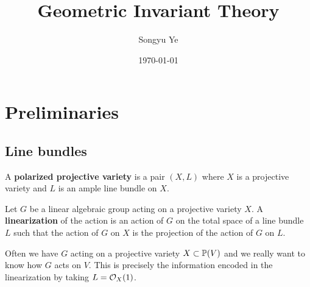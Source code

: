 \documentclass[12pt]{article}
\begin{document}
\rhead{\today}
\cfoot{\thepage}

\title{Geometric Invariant Theory}

\author{Songyu Ye}
\date{\today}
\maketitle


\begin{abstract}
\end{abstract}

\tableofcontents

\section{Preliminaries}
\subsection{Line bundles}
\begin{definition}
     A \textbf{polarized projective variety} is a pair $(X, L)$ where $X$ is a projective variety and $L$ is an ample line bundle on $X$.
\end{definition}

\begin{definition}
    [Linearization] Let $G$ be a linear algebraic group acting on a projective variety $X$. A \textbf{linearization} of the action is an action of $G$ on the total space of a line bundle $L$ such that the action of $G$ on $X$ is the projection of the action of $G$ on $L$.
\end{definition}

\begin{remark}
    Often we have $G$ acting on a projective variety $X \subset \P(V)$ and we really want to know how $G$ acts on $V$. This is precisely the information encoded in the linearization by taking $L = \cO_X(1)$.
\end{remark}
\end{document}
